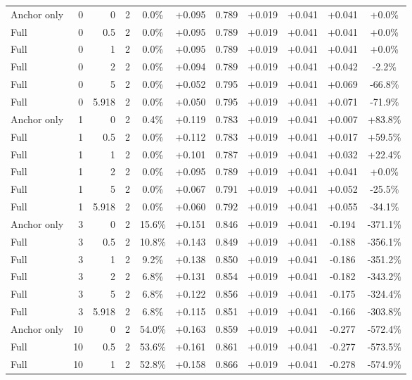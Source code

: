 \begin{table}[htbp]
\begin{tabular}{lrrrccccccc}
Anchor only & 0 & 0 & 2 & 0.0\% & +0.095 & 0.789 & +0.019 & +0.041 & +0.041 & +0.0\% \\
Full & 0 & 0.5 & 2 & 0.0\% & +0.095 & 0.789 & +0.019 & +0.041 & +0.041 & +0.0\% \\
Full & 0 & 1 & 2 & 0.0\% & +0.095 & 0.789 & +0.019 & +0.041 & +0.041 & +0.0\% \\
Full & 0 & 2 & 2 & 0.0\% & +0.094 & 0.789 & +0.019 & +0.041 & +0.042 & -2.2\% \\
Full & 0 & 5 & 2 & 0.0\% & +0.052 & 0.795 & +0.019 & +0.041 & +0.069 & -66.8\% \\
Full & 0 & 5.918 & 2 & 0.0\% & +0.050 & 0.795 & +0.019 & +0.041 & +0.071 & -71.9\% \\
Anchor only & 1 & 0 & 2 & 0.4\% & +0.119 & 0.783 & +0.019 & +0.041 & +0.007 & +83.8\% \\
Full & 1 & 0.5 & 2 & 0.0\% & +0.112 & 0.783 & +0.019 & +0.041 & +0.017 & +59.5\% \\
Full & 1 & 1 & 2 & 0.0\% & +0.101 & 0.787 & +0.019 & +0.041 & +0.032 & +22.4\% \\
Full & 1 & 2 & 2 & 0.0\% & +0.095 & 0.789 & +0.019 & +0.041 & +0.041 & +0.0\% \\
Full & 1 & 5 & 2 & 0.0\% & +0.067 & 0.791 & +0.019 & +0.041 & +0.052 & -25.5\% \\
Full & 1 & 5.918 & 2 & 0.0\% & +0.060 & 0.792 & +0.019 & +0.041 & +0.055 & -34.1\% \\
Anchor only & 3 & 0 & 2 & 15.6\% & +0.151 & 0.846 & +0.019 & +0.041 & -0.194 & -371.1\% \\
Full & 3 & 0.5 & 2 & 10.8\% & +0.143 & 0.849 & +0.019 & +0.041 & -0.188 & -356.1\% \\
Full & 3 & 1 & 2 & 9.2\% & +0.138 & 0.850 & +0.019 & +0.041 & -0.186 & -351.2\% \\
Full & 3 & 2 & 2 & 6.8\% & +0.131 & 0.854 & +0.019 & +0.041 & -0.182 & -343.2\% \\
Full & 3 & 5 & 2 & 6.8\% & +0.122 & 0.856 & +0.019 & +0.041 & -0.175 & -324.4\% \\
Full & 3 & 5.918 & 2 & 6.8\% & +0.115 & 0.851 & +0.019 & +0.041 & -0.166 & -303.8\% \\
Anchor only & 10 & 0 & 2 & 54.0\% & +0.163 & 0.859 & +0.019 & +0.041 & -0.277 & -572.4\% \\
Full & 10 & 0.5 & 2 & 53.6\% & +0.161 & 0.861 & +0.019 & +0.041 & -0.277 & -573.5\% \\
Full & 10 & 1 & 2 & 52.8\% & +0.158 & 0.866 & +0.019 & +0.041 & -0.278 & -574.9\% \\

\end{tabular}
\end{table}
